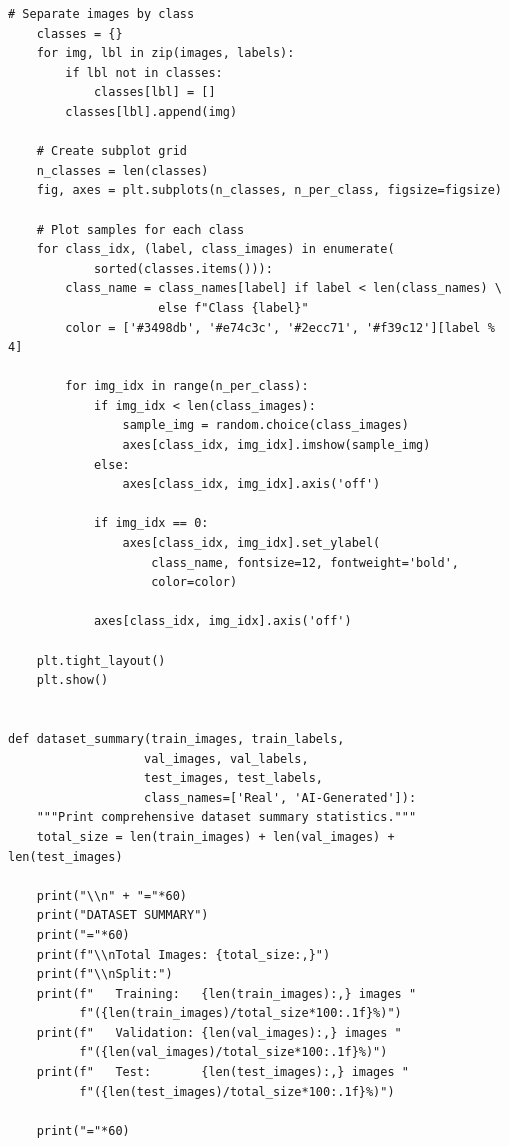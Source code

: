 \documentclass[man,12pt,letterpaper,donotrepeattitle,floatsintext]{apa7}
\begin{document}
\begin{lstlisting}[style=pythonstyle]
    # Separate images by class
    classes = {}
    for img, lbl in zip(images, labels):
        if lbl not in classes:
            classes[lbl] = []
        classes[lbl].append(img)
    
    # Create subplot grid
    n_classes = len(classes)
    fig, axes = plt.subplots(n_classes, n_per_class, figsize=figsize)
    
    # Plot samples for each class
    for class_idx, (label, class_images) in enumerate(
            sorted(classes.items())):
        class_name = class_names[label] if label < len(class_names) \
                     else f"Class {label}"
        color = ['#3498db', '#e74c3c', '#2ecc71', '#f39c12'][label % 4]
        
        for img_idx in range(n_per_class):
            if img_idx < len(class_images):
                sample_img = random.choice(class_images)
                axes[class_idx, img_idx].imshow(sample_img)
            else:
                axes[class_idx, img_idx].axis('off')
            
            if img_idx == 0:
                axes[class_idx, img_idx].set_ylabel(
                    class_name, fontsize=12, fontweight='bold', 
                    color=color)
            
            axes[class_idx, img_idx].axis('off')
    
    plt.tight_layout()
    plt.show()


def dataset_summary(train_images, train_labels, 
                   val_images, val_labels, 
                   test_images, test_labels, 
                   class_names=['Real', 'AI-Generated']):
    """Print comprehensive dataset summary statistics."""
    total_size = len(train_images) + len(val_images) + len(test_images)
    
    print("\\n" + "="*60)
    print("DATASET SUMMARY")
    print("="*60)
    print(f"\\nTotal Images: {total_size:,}")
    print(f"\\nSplit:")
    print(f"   Training:   {len(train_images):,} images "
          f"({len(train_images)/total_size*100:.1f}%)")
    print(f"   Validation: {len(val_images):,} images "
          f"({len(val_images)/total_size*100:.1f}%)")
    print(f"   Test:       {len(test_images):,} images "
          f"({len(test_images)/total_size*100:.1f}%)")
    
    print("="*60)
\end{lstlisting}
\end{document}

